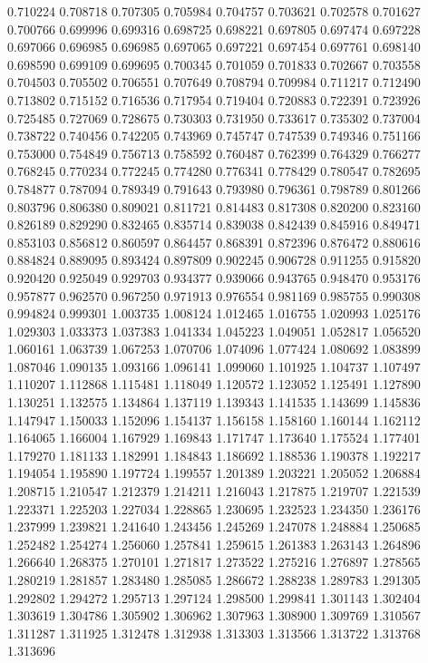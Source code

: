0.710224
0.708718
0.707305
0.705984
0.704757
0.703621
0.702578
0.701627
0.700766
0.699996
0.699316
0.698725
0.698221
0.697805
0.697474
0.697228
0.697066
0.696985
0.696985
0.697065
0.697221
0.697454
0.697761
0.698140
0.698590
0.699109
0.699695
0.700345
0.701059
0.701833
0.702667
0.703558
0.704503
0.705502
0.706551
0.707649
0.708794
0.709984
0.711217
0.712490
0.713802
0.715152
0.716536
0.717954
0.719404
0.720883
0.722391
0.723926
0.725485
0.727069
0.728675
0.730303
0.731950
0.733617
0.735302
0.737004
0.738722
0.740456
0.742205
0.743969
0.745747
0.747539
0.749346
0.751166
0.753000
0.754849
0.756713
0.758592
0.760487
0.762399
0.764329
0.766277
0.768245
0.770234
0.772245
0.774280
0.776341
0.778429
0.780547
0.782695
0.784877
0.787094
0.789349
0.791643
0.793980
0.796361
0.798789
0.801266
0.803796
0.806380
0.809021
0.811721
0.814483
0.817308
0.820200
0.823160
0.826189
0.829290
0.832465
0.835714
0.839038
0.842439
0.845916
0.849471
0.853103
0.856812
0.860597
0.864457
0.868391
0.872396
0.876472
0.880616
0.884824
0.889095
0.893424
0.897809
0.902245
0.906728
0.911255
0.915820
0.920420
0.925049
0.929703
0.934377
0.939066
0.943765
0.948470
0.953176
0.957877
0.962570
0.967250
0.971913
0.976554
0.981169
0.985755
0.990308
0.994824
0.999301
1.003735
1.008124
1.012465
1.016755
1.020993
1.025176
1.029303
1.033373
1.037383
1.041334
1.045223
1.049051
1.052817
1.056520
1.060161
1.063739
1.067253
1.070706
1.074096
1.077424
1.080692
1.083899
1.087046
1.090135
1.093166
1.096141
1.099060
1.101925
1.104737
1.107497
1.110207
1.112868
1.115481
1.118049
1.120572
1.123052
1.125491
1.127890
1.130251
1.132575
1.134864
1.137119
1.139343
1.141535
1.143699
1.145836
1.147947
1.150033
1.152096
1.154137
1.156158
1.158160
1.160144
1.162112
1.164065
1.166004
1.167929
1.169843
1.171747
1.173640
1.175524
1.177401
1.179270
1.181133
1.182991
1.184843
1.186692
1.188536
1.190378
1.192217
1.194054
1.195890
1.197724
1.199557
1.201389
1.203221
1.205052
1.206884
1.208715
1.210547
1.212379
1.214211
1.216043
1.217875
1.219707
1.221539
1.223371
1.225203
1.227034
1.228865
1.230695
1.232523
1.234350
1.236176
1.237999
1.239821
1.241640
1.243456
1.245269
1.247078
1.248884
1.250685
1.252482
1.254274
1.256060
1.257841
1.259615
1.261383
1.263143
1.264896
1.266640
1.268375
1.270101
1.271817
1.273522
1.275216
1.276897
1.278565
1.280219
1.281857
1.283480
1.285085
1.286672
1.288238
1.289783
1.291305
1.292802
1.294272
1.295713
1.297124
1.298500
1.299841
1.301143
1.302404
1.303619
1.304786
1.305902
1.306962
1.307963
1.308900
1.309769
1.310567
1.311287
1.311925
1.312478
1.312938
1.313303
1.313566
1.313722
1.313768
1.313696
